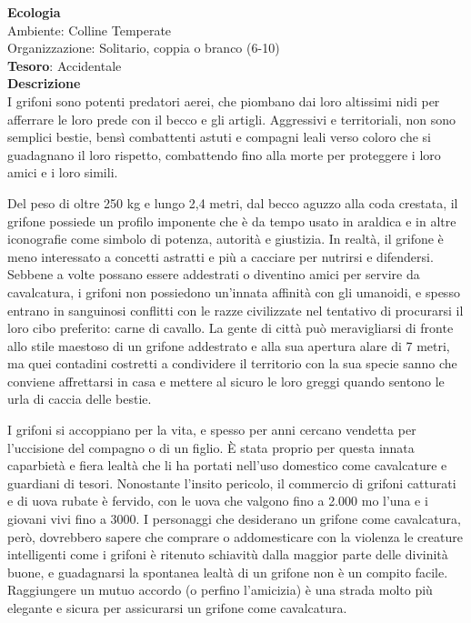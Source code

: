 \begin{multicols}{2}
	\textbf{Ecologia}\\
	Ambiente: Colline Temperate\\
	Organizzazione: Solitario, coppia o branco (6-10)\\
	\textbf{Tesoro}: Accidentale\\
	\textbf{Descrizione}\\
	I grifoni sono potenti predatori aerei, che piombano dai loro altissimi nidi per afferrare le loro prede con il becco e gli artigli. Aggressivi e territoriali, non sono semplici bestie, bensì combattenti astuti e compagni leali verso coloro che si guadagnano il loro rispetto, combattendo fino alla morte per proteggere i loro amici e i loro simili.

	Del peso di oltre 250 kg e lungo 2,4 metri, dal becco aguzzo alla coda crestata, il grifone possiede un profilo imponente che è da tempo usato in araldica e in altre iconografie come simbolo di potenza, autorità e giustizia. In realtà, il grifone è meno interessato a concetti astratti e più a cacciare per nutrirsi e difendersi. Sebbene a volte possano essere addestrati o diventino amici per servire da cavalcatura, i grifoni non possiedono un'innata affinità con gli umanoidi, e spesso entrano in sanguinosi conflitti con le razze civilizzate nel tentativo di procurarsi il loro cibo preferito: carne di cavallo. La gente di città può meravigliarsi di fronte allo stile maestoso di un grifone addestrato e alla sua apertura alare di 7 metri, ma quei contadini costretti a condividere il territorio con la sua specie sanno che conviene affrettarsi in casa e mettere al sicuro le loro greggi quando sentono le urla di caccia delle bestie.

	I grifoni si accoppiano per la vita, e spesso per anni cercano vendetta per l'uccisione del compagno o di un figlio. È stata proprio per questa innata caparbietà e fiera lealtà che li ha portati nell'uso domestico come cavalcature e guardiani di tesori. Nonostante l'insito pericolo, il commercio di grifoni catturati e di uova rubate è fervido, con le uova che valgono fino a 2.000 mo l'una e i giovani vivi fino a 3000. I personaggi che desiderano un grifone come cavalcatura, però, dovrebbero sapere che comprare o addomesticare con la violenza le creature intelligenti come i grifoni è ritenuto schiavitù dalla maggior parte delle divinità buone, e guadagnarsi la spontanea lealtà di un grifone non è un compito facile. Raggiungere un mutuo accordo (o perfino l'amicizia) è una strada molto più elegante e sicura per assicurarsi un grifone come cavalcatura.


\end{multicols}
